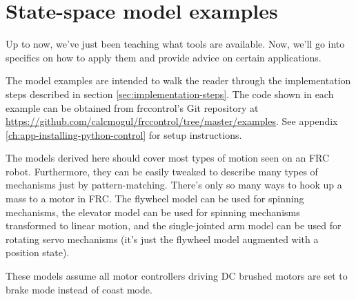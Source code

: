 
\chapter{State-space model examples}

Up to now, we've just been teaching what tools are available. Now, we'll go into
specifics on how to apply them and provide advice on certain applications.

The model examples are intended to walk the reader through the implementation
steps described in section \ref{sec:implementation-steps}. The code shown in
each example can be obtained from frccontrol's Git repository at
\url{https://github.com/calcmogul/frccontrol/tree/master/examples}.
See appendix \ref{ch:app-installing-python-control} for setup instructions.

The models derived here should cover most types of motion seen on an FRC robot.
Furthermore, they can be easily tweaked to describe many types of mechanisms
just by pattern-matching. There's only so many ways to hook up a mass to a motor
in FRC. The flywheel model can be used for spinning mechanisms, the elevator
model can be used for spinning mechanisms transformed to linear motion, and the
single-jointed arm model can be used for rotating servo mechanisms (it's just
the flywheel model augmented with a position state).

These models assume all motor controllers driving DC brushed motors are set to
brake mode instead of coast mode.








